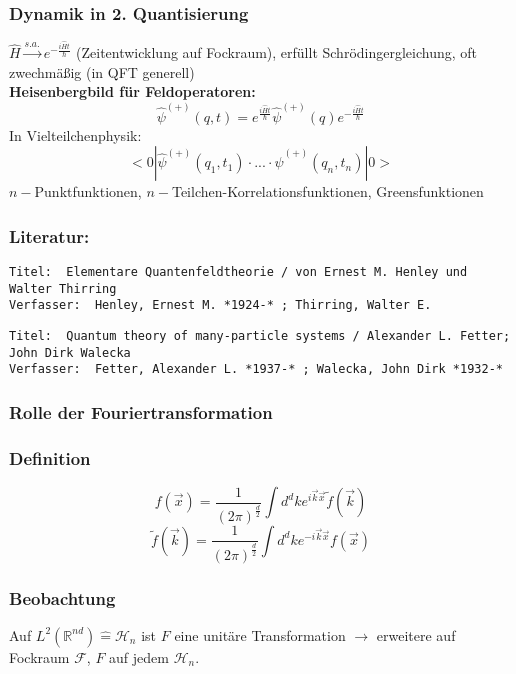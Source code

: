 \documentclass[twoside,a4paper]{scrartcl}
\newcommand{\R}{\mathbb{R}}
\renewcommand{\1}{\mathds{1}}
\newcommand{\ra}{\rightarrow}
\renewcommand{\H}{\mathcal{H}}
\newcommand{\F}{\mathcal{F}}
\renewcommand{\R}{\mathbb{R}}
\begin{document}
\subsubsection*{Dynamik in 2. Quantisierung}
$\hat H \stackrel{s.a.}{\ra} e^{-\frac{i\hat H t}{\hbar}}$ (Zeitentwicklung auf Fockraum), erfüllt Schrödingergleichung, oft zwechmäßig (in QFT generell)\\
\textbf{Heisenbergbild für Feldoperatoren:}\\
$$\hat \psi^{(+)}(q,t)=e^{\frac{i\hat H t}{\hbar}} \hat \psi^{(+)}(q)e^{-\frac{i\hat H t}{\hbar}}$$
In Vielteilchenphysik:
$$<0|\hat\psi^{(+)}(q_1,t_1)\cdot ... \cdot\hat\psi^{(+)}(q_n,t_n)|0> $$
$n-$Punktfunktionen, $n-$Teilchen-Korrelationsfunktionen, Greensfunktionen\\
\subsubsection*{Literatur:}
\begin{tiny}
\begin{verbatim}
Titel: 	Elementare Quantenfeldtheorie / von Ernest M. Henley und Walter Thirring
Verfasser: 	Henley, Ernest M. *1924-* ; Thirring, Walter E.
\end{verbatim}
\end{tiny}


\begin{tiny}
\begin{verbatim}
Titel: 	Quantum theory of many-particle systems / Alexander L. Fetter; John Dirk Walecka
Verfasser: 	Fetter, Alexander L. *1937-* ; Walecka, John Dirk *1932-*
\end{verbatim}
\end{tiny}

\subsubsection*{Rolle der Fouriertransformation}
\subsubsection*{Definition}
$$f(\vec x)=\frac{1}{(2\pi)^{\frac{d}{2}}}\int d^dk e^{i\vec k\vec x} \tilde f(\vec k)$$
$$\tilde f(\vec k)=\frac{1}{(2\pi)^{\frac{d}{2}}}\int d^dk e^{-i\vec k\vec x} f(\vec x)$$
\subsubsection*{Beobachtung}
Auf $L^2(\R^{nd}) \mathrel{\widehat{=}} \H_n$ ist $F$ eine unitäre Transformation $\ra$ erweitere auf Fockraum $\F$, $F$ auf jedem $\H_n$.
\end{document}
